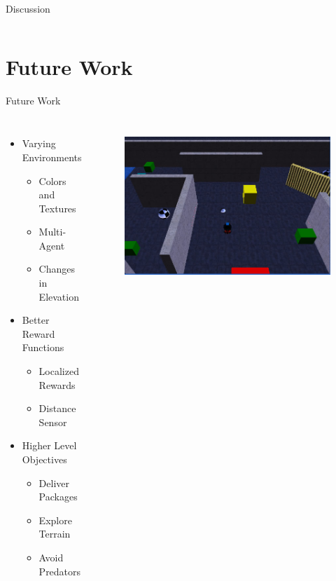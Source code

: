 \documentclass{beamer}
\begin{document}
\begin{frame}{Discussion}
\begin{columns}[c c]
		\end{columns}

	\end{frame}

\section{Future Work}
	\begin{frame}{Future Work}

		\begin{columns}[c c]


				\begin{itemize}
					\item Varying Environments
						\begin{itemize}
						\item Colors and Textures
						\item Multi-Agent
						\item Changes in Elevation
						\end{itemize}
					\item Better Reward Functions
						\begin{itemize}
						\item Localized Rewards
						\item Distance Sensor
						\end{itemize}
					\item Higher Level Objectives
						\begin{itemize}
						\item Deliver Packages
						\item Explore Terrain
						\item Avoid Predators
						\end{itemize}
				\end{itemize}


				\begin{figure}
					\includegraphics[width=\columnwidth]{SimulatorInitialView.jpg}
					\label{Roomba}
				\end{figure}


\end{columns}
\end{frame}
\end{document}
